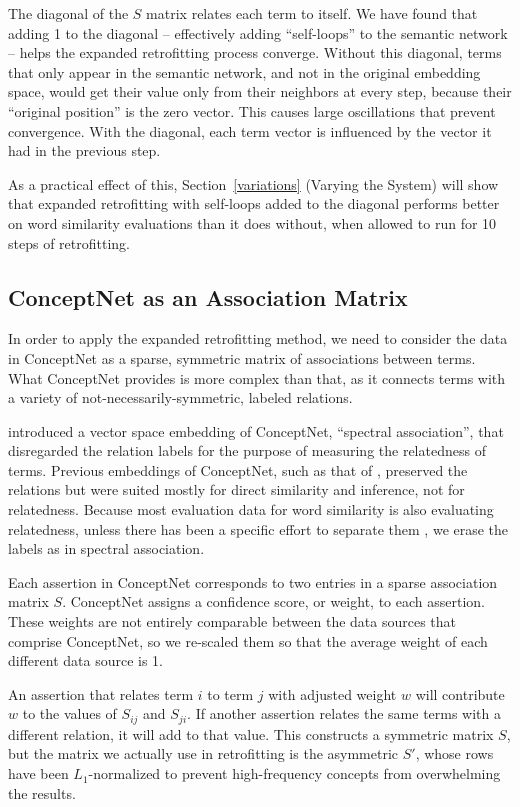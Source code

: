 \documentclass[11pt,letterpaper]{article}
\begin{document}
The diagonal of the $S$ matrix relates each term to itself. We have found that
adding 1 to the diagonal -- effectively adding ``self-loops'' to the semantic
network -- helps the expanded retrofitting process converge.  Without this
diagonal, terms that only appear in the semantic network, and not in the
original embedding space, would get their value only from their neighbors at
every step, because their ``original position'' is the zero vector. This causes
large oscillations that prevent convergence.  With the diagonal, each term
vector is influenced by the vector it had in the previous step.

As a practical effect of this, Section~\ref{variations} (Varying the System)
will show that expanded retrofitting with self-loops added to the diagonal
performs better on word similarity evaluations than it does without, when
allowed to run for 10 steps of retrofitting.


\subsection{ConceptNet as an Association Matrix}

In order to apply the expanded retrofitting method, we need to consider the data in
ConceptNet as a sparse, symmetric matrix of associations between terms. What
ConceptNet provides is more complex than that, as it connects terms with a
variety of not-necessarily-symmetric, labeled relations.

 introduced a vector space embedding of ConceptNet,
``spectral association'', that disregarded the relation labels for the purpose
of measuring the relatedness of terms. Previous embeddings of ConceptNet, such
as that of , preserved the relations but were
suited mostly for direct similarity and inference, not for relatedness. Because
most evaluation data for word similarity is also evaluating relatedness, unless
there has been a specific effort to separate them \cite{agirre2009similarity},
we erase the labels as in spectral association.

Each assertion in ConceptNet corresponds to two entries in a sparse
association matrix $S$.  ConceptNet assigns a confidence score, or weight, to
each assertion.  These weights are not entirely comparable between the data
sources that comprise ConceptNet, so we re-scaled them so that the average
weight of each different data source is 1.

An assertion that relates term $i$ to term $j$ with adjusted weight $w$ will
contribute $w$ to the values of $S_{ij}$ and $S_{ji}$. If another assertion
relates the same terms with a different relation, it will add to that value.
This constructs a symmetric matrix $S$, but the matrix we actually use in
retrofitting is the asymmetric $S'$, whose rows have been $L_1$-normalized to
prevent high-frequency concepts from overwhelming the results.
\end{document}

